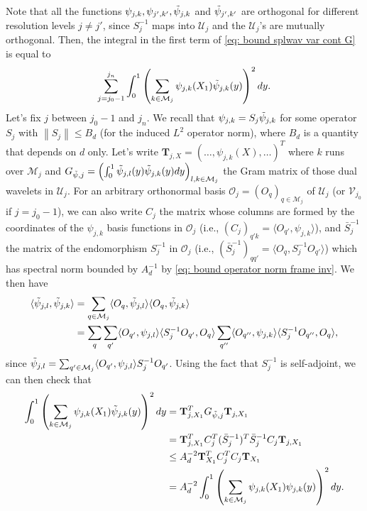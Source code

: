 \documentclass[preprint]{imsart}
\newcommand\norm[1]{\left\lVert#1\right\rVert}
\numberwithin{equation}{section}
\begin{document}
\begin{appendix}
Note that all the functions $\psi_{j,k},\psi_{j',k'},\Tilde{\psi}_{j,k}$ and $\Tilde{\psi}_{j',k'}$ are orthogonal for different resolution levels $j\neq j'$, since $S_j^{-1}$ maps into $\mathcal{U}_j$ and the $\mathcal{U}_j$'s are mutually orthogonal. Then, the integral in the first term of \eqref{eq: bound splwav var cont G} is equal to
\[
    \sum_{j=j_0-1}^{j_n} \int_0^1 \left( \sum_{k\in\mathcal{M}_{j}} \psi_{j,k}(X_1)\Tilde{\psi}_{j,k}(y) \right)^2dy.
\]
Let's fix $j$ between $j_0-1$ and $j_n$. We recall that $\psi_{j,k} = S_{j}\Tilde{\psi}_{j,k}$ for some operator $S_{j}$ with $\norm{S_{j}}\leq B_d$ (for the induced $L^2$ operator norm), where $B_d$ is a quantity that depends on $d$ only. Let's write $\mathbf{T}_{j,X}=(\dots,\psi_{j,k}(X),\dots)^T$ where $k$ runs over $\mathcal{M}_{j}$ and $G_{\tilde{\psi},j}=\left(\int_0^1  \Tilde{\psi}_{j,l}(y)\Tilde{\psi}_{j,k}(y) dy\right)_{l,k\in \mathcal{M}_j}$ the Gram matrix of those dual wavelets in $\mathcal{U}_j$. For an arbitrary orthonormal basis $\mathcal{O}_j=(O_q)_{q\in \mathcal{M}_j}$ of $\mathcal{U}_j$ (or $\mathcal{V}_{j_0}$ if $j=j_0-1$), we can also write $C_j$ the matrix whose columns are formed by the coordinates of the $\psi_{j,k}$ basis functions in $\mathcal{O}_j$ (i.e., $(C_j)_{q'k}= \langle O_{q'}, \psi_{j,k}\rangle$), and $\bar{S}_{j}^{-1}$ the matrix of the endomorphism $S_{j}^{-1}$ in  $\mathcal{O}_j$ (i.e., $(\bar{S}_{j}^{-1})_{qq'}= \langle O_{q}, S_j^{-1}O_{q'}\rangle$) which has spectral norm bounded by $A_d^{-1}$ by \eqref{eq: bound operator norm frame inv}. We then have 
\begin{align*}
\langle \Tilde{\psi}_{j,l},  \Tilde{\psi}_{j,k}\rangle &= \sum_{q\in\mathcal{M}_j}  \langle O_{q}, \Tilde{\psi}_{j,l}\rangle \langle O_{q}, \Tilde{\psi}_{j,k}\rangle\\
&=\sum_q \sum_{q'} \langle O_{q'}, \psi_{j,l}\rangle \langle S_j^{-1}O_{q'}, O_q\rangle  \sum_{q''} \langle O_{q''}, \psi_{j,k}\rangle \langle S_j^{-1}O_{q''}, O_q\rangle,
\end{align*}
since $\Tilde{\psi}_{j,l} = \sum_{q'\in\mathcal{M}_j} \langle O_{q'}, \psi_{j,l}\rangle S_j^{-1}O_{q'}$.
Using the fact that $S_j^{-1}$ is self-adjoint, we can then check that
\begin{align}\label{eq: get rid of tilde}
    \int_0^1 \left( \sum_{k\in\mathcal{M}_{j}} \psi_{j,k}(X_1)\Tilde{\psi}_{j,k}(y) \right)^2dy &= \mathbf{T}_{j,X_1}^T G_{\tilde{\psi},j}\mathbf{T}_{j,X_1}\nonumber\\
    &= \mathbf{T}_{j,X_1}^T C_j^T (\bar{S}_{j}^{-1})^{T} \bar{S}_{j}^{-1} C_j \mathbf{T}_{j,X_1}\nonumber\\
    &\leq A_d^{-2} \mathbf{T}_{X_1}^T C_j^T C_j \mathbf{T}_{X_1}\nonumber\\
    &= A_d^{-2} \int_0^1 \left(  \sum_{k\in\mathcal{M}_{j}} \psi_{j,k}(X_1)\psi_{j,k}(y) \right)^2dy.
\end{align}


\end{appendix}
\end{document}
